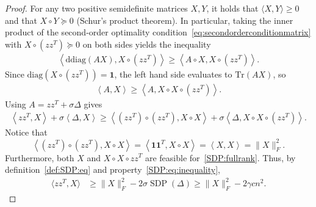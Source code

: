 \documentclass{colt2016} %
\newcommand{\inner}[2]{\left\langle{#1},{#2}\right\rangle}
\newcommand{\trace}{\mathrm{Tr}}
\newcommand{\diag}{\mathrm{diag}}
\newcommand{\1}{\mathbf{1}}
\newcommand{\TODO}[1]{{\color{red}{[#1]}}}
\newcommand{\ddiag}{\mathrm{ddiag}}
\begin{document}
\begin{proof}
	For any two positive semidefinite matrices $X,Y$, it holds that $\langle X, Y \rangle \geq 0$ and that $X \circ Y \succeq 0$ (Schur's product theorem). In particular, taking the inner product of the second-order optimality condition~\eqref{eq:secondorderconditionmatrix} with $X \circ (zz^T) \succeq 0$ on both sides yields the inequality
	\begin{align*}
		\inner{\ddiag(AX)}{X \circ (zz^T)} \geq \inner{A\circ X}{X \circ (zz^T)}.
	\end{align*}
	Since $\diag(X \circ (zz^T)) = \1$, the left hand side evaluates to $\trace(AX)$, so
	\begin{align*}
	\inner{A}{X} \geq \inner{A}{X \circ X \circ (zz^T)}.
	\end{align*}
	Using $A = zz^T + \sigma \Delta$ gives
	\begin{align*}
		\inner{zz^T}{X} + \sigma \inner{\Delta}{X} \geq \inner{(zz^T)\circ(zz^T)}{X \circ X} + \sigma \inner{\Delta}{X \circ X \circ (zz^T)}.
	\end{align*}
	Notice that $$\inner{(zz^T)\circ(zz^T)}{X \circ X} = \inner{\1\1^T}{X\circ X} = \inner{X}{X} = \|X\|_F^2.$$ Furthermore, both $X$ and $X \circ X \circ zz^T$ are feasible for~\eqref{SDP:fullrank}. Thus, by definition~\eqref{def:SDP:eq} and property~\eqref{SDP:eq:inequality},
	\begin{align}
	\langle zz^T, X \rangle &\geq \|X\|_F^2 - 2\sigma\operatorname{SDP}(\Delta) \geq \|X\|_F^2 - 2\gamma c n^2.
	\label{eq:oneonetransposeX}
	\end{align}

\end{proof}
\end{document}
